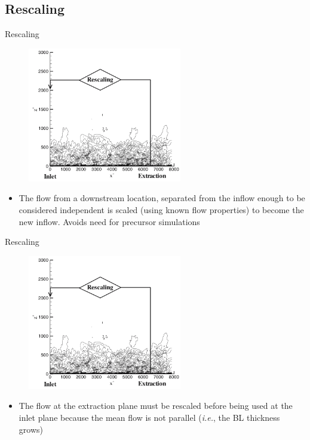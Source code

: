 \subsection{Rescaling}
\begin{frame}{Rescaling}
	\begin{figure}
		\includegraphics[width=0.6\textwidth]{inlet4}
	\end{figure}
	\begin{itemize}
	\item The flow from a downstream location, separated from the inflow enough to be considered independent is scaled (using known flow properties) to become the new inflow. Avoids need for precursor simulations	
	\end{itemize}
\end{frame}
\begin{frame}{Rescaling}
	\begin{figure}
		\includegraphics[width=0.6\textwidth]{inlet4}
	\end{figure}
	\begin{itemize}
	\item The flow at the extraction plane must be rescaled before being used at the inlet plane because the mean flow is not parallel (\textit{i.e.}, the BL thickness grows)
	\end{itemize}
\end{frame}
